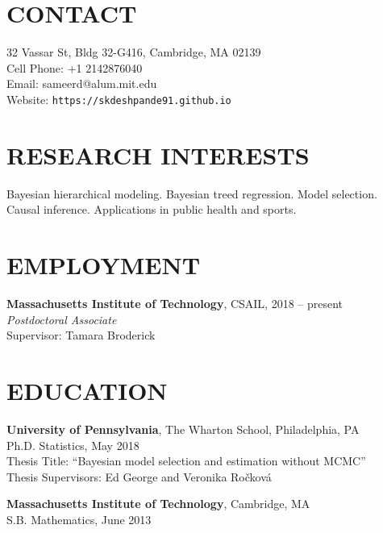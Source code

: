 \documentclass[margin]{res}
\begin{document}
  
                        
\begin{resume}                        
  
  \section{CONTACT} 
  32 Vassar St, Bldg 32-G416, Cambridge, MA 02139 \\   
  Cell Phone: +1 2142876040 \\ 
  Email: sameerd@alum.mit.edu \\
  Website: \texttt{https://skdeshpande91.github.io}

  \section{RESEARCH INTERESTS}
  Bayesian hierarchical modeling. Bayesian treed regression. Model selection. Causal inference. Applications in public health and sports. 
              
\section{EMPLOYMENT} 

\textbf{Massachusetts Institute of Technology}, CSAIL, 2018 -- present \\
\emph{Postdoctoral Associate} \\
Supervisor: Tamara Broderick
              
\section{EDUCATION}      
                {\bf University of Pennsylvania}, The Wharton School, Philadelphia, PA \\
                Ph.D. Statistics, May 2018 \\
		Thesis Title: ``Bayesian model selection and estimation without MCMC'' \\
		Thesis Supervisors: Ed George and Veronika Ro\v{c}kov\'{a}
                
                {\bf Massachusetts Institute of Technology}, Cambridge, MA \\
                S.B. Mathematics, June 2013 
  

\end{resume}
\end{document}
